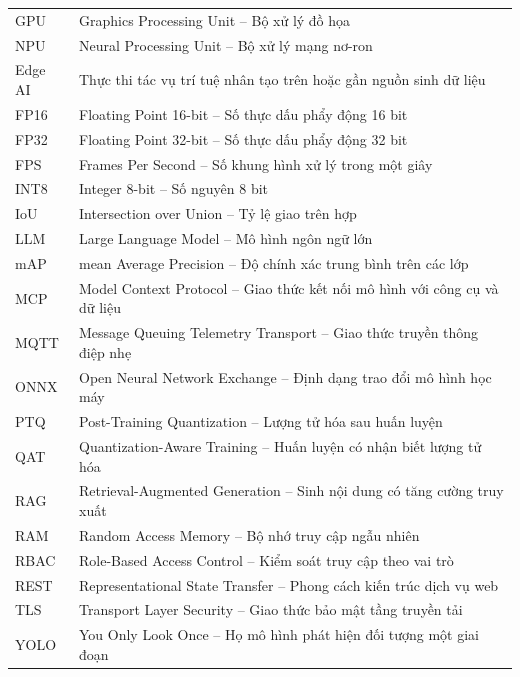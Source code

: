 \begin{longtable}{L{2.6cm}L{11.5cm}}
GPU     & Graphics Processing Unit -- Bộ xử lý đồ họa\\
NPU     & Neural Processing Unit -- Bộ xử lý mạng nơ-ron\\
Edge AI & Thực thi tác vụ trí tuệ nhân tạo trên hoặc gần nguồn sinh dữ liệu\\
FP16    & Floating Point 16-bit -- Số thực dấu phẩy động 16 bit\\
FP32    & Floating Point 32-bit -- Số thực dấu phẩy động 32 bit\\
FPS     & Frames Per Second -- Số khung hình xử lý trong một giây\\
INT8    & Integer 8-bit -- Số nguyên 8 bit\\
IoU     & Intersection over Union -- Tỷ lệ giao trên hợp\\
LLM     & Large Language Model -- Mô hình ngôn ngữ lớn\\
mAP     & mean Average Precision -- Độ chính xác trung bình trên các lớp\\
MCP     & Model Context Protocol -- Giao thức kết nối mô hình với công cụ và dữ liệu\\
MQTT    & Message Queuing Telemetry Transport -- Giao thức truyền thông điệp nhẹ\\
ONNX    & Open Neural Network Exchange -- Định dạng trao đổi mô hình học máy\\
PTQ     & Post-Training Quantization -- Lượng tử hóa sau huấn luyện\\
QAT     & Quantization-Aware Training -- Huấn luyện có nhận biết lượng tử hóa\\
RAG     & Retrieval-Augmented Generation -- Sinh nội dung có tăng cường truy xuất\\
RAM     & Random Access Memory -- Bộ nhớ truy cập ngẫu nhiên\\
RBAC    & Role-Based Access Control -- Kiểm soát truy cập theo vai trò\\
REST    & Representational State Transfer -- Phong cách kiến trúc dịch vụ web\\
TLS     & Transport Layer Security -- Giao thức bảo mật tầng truyền tải\\
YOLO    & You Only Look Once -- Họ mô hình phát hiện đối tượng một giai đoạn\\
\bottomrule
\end{longtable}
